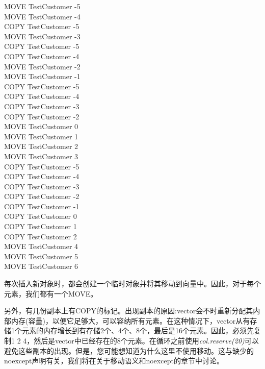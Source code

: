 \begin{tcolorbox}[colback=white,colframe=black]
MOVE TestCustomer -5 \\
MOVE TestCustomer -4 \\
COPY TestCustomer -5 \\
MOVE TestCustomer -3 \\
COPY TestCustomer -5 \\
COPY TestCustomer -4 \\
MOVE TestCustomer -2 \\
MOVE TestCustomer -1 \\
COPY TestCustomer -5 \\
COPY TestCustomer -4 \\
COPY TestCustomer -3 \\
COPY TestCustomer -2 \\
MOVE TestCustomer 0 \\
MOVE TestCustomer 1 \\
MOVE TestCustomer 2 \\
MOVE TestCustomer 3 \\
COPY TestCustomer -5 \\
COPY TestCustomer -4 \\
COPY TestCustomer -3 \\
COPY TestCustomer -2 \\
COPY TestCustomer -1 \\
COPY TestCustomer 0 \\
COPY TestCustomer 1 \\
COPY TestCustomer 2 \\
MOVE TestCustomer 4 \\
MOVE TestCustomer 5 \\
MOVE TestCustomer 6 \\
\end{tcolorbox}

每次插入新对象时，都会创建一个临时对象并将其移动到向量中。因此，对于每个元素，我们都有一个MOVE。\par

另外，有几份副本上有COPY的标记。出现副本的原因:vector会不时重新分配其内部内存(容量)，以便它足够大，可以容纳所有元素。在这种情况下，vector从有存储1个元素的内存增长到有存储2个、4个、8个，最后是16个元素。因此，必须先复制1 2 4，然后是vector中已经存在的8个元素。在循环之前使用\textit{col.reserve(20)}可以避免这些副本的出现。但是，您可能想知道为什么这里不使用移动。这与缺少的noexcept声明有关，我们将在关于移动语义和noexcept的章节中讨论。\par

